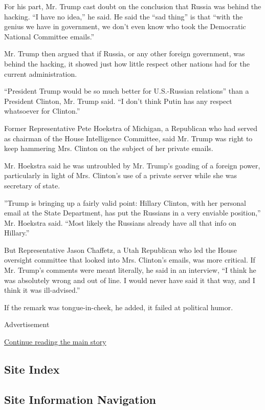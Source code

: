 For his part, Mr. Trump cast doubt on the conclusion that Russia was
behind the hacking. ``I have no idea,'' he said. He said the ``sad
thing'' is that ``with the genius we have in government, we don't even
know who took the Democratic National Committee emails.''

Mr. Trump then argued that if Russia, or any other foreign government,
was behind the hacking, it showed just how little respect other nations
had for the current administration.

``President Trump would be so much better for U.S.-Russian relations''
than a President Clinton, Mr. Trump said. ``I don't think Putin has any
respect whatsoever for Clinton.''

Former Representative Pete Hoekstra of Michigan, a Republican who had
served as chairman of the House Intelligence Committee, said Mr. Trump
was right to keep hammering Mrs. Clinton on the subject of her private
emails.

Mr. Hoekstra said he was untroubled by Mr. Trump's goading of a foreign
power, particularly in light of Mrs. Clinton's use of a private server
while she was secretary of state.

''Trump is bringing up a fairly valid point: Hillary Clinton, with her
personal email at the State Department, has put the Russians in a very
enviable position,'' Mr. Hoekstra said. ``Most likely the Russians
already have all that info on Hillary.''

But Representative Jason Chaffetz, a Utah Republican who led the House
oversight committee that looked into Mrs. Clinton's emails, was more
critical. If Mr. Trump's comments were meant literally, he said in an
interview, ``I think he was absolutely wrong and out of line. I would
never have said it that way, and I think it was ill-advised.''

If the remark was tongue-in-cheek, he added, it failed at political
humor.

Advertisement

\protect\hyperlink{after-bottom}{Continue reading the main story}

\hypertarget{site-index}{%
\subsection{Site Index}\label{site-index}}

\hypertarget{site-information-navigation}{%
\subsection{Site Information
Navigation}\label{site-information-navigation}}


